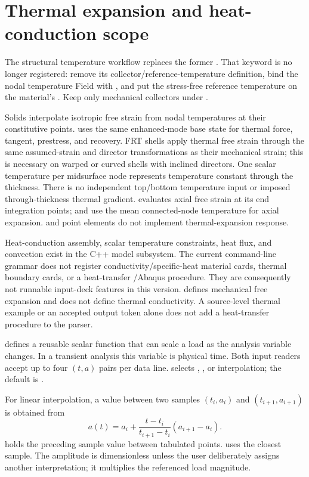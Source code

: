 \section{Thermal expansion and heat-conduction scope}

The structural temperature workflow replaces the former . That keyword is no longer registered: remove its collector/reference-temperature definition, bind the nodal temperature Field with , and put the stress-free reference temperature on the material's . Keep only mechanical collectors under .

Solids interpolate isotropic free strain from nodal temperatures at their constitutive points.  uses the same enhanced-mode base state for thermal force, tangent, prestress, and recovery. FRT shells apply thermal free strain through the same assumed-strain and director transformations as their mechanical strain; this is necessary on warped or curved shells with inclined directors. One scalar temperature per midsurface node represents temperature constant through the thickness. There is no independent top/bottom temperature input or imposed through-thickness thermal gradient.  evaluates axial free strain at its end integration points;  and  use the mean connected-node temperature for axial expansion.  and point elements do not implement thermal-expansion response.

Heat-conduction assembly, scalar temperature constraints, heat flux, and convection exist in the C++ model subsystem. The current command-line grammar does not register conductivity/specific-heat material cards, thermal boundary cards, or a heat-transfer /Abaqus procedure. They are consequently not runnable input-deck features in this version.  defines mechanical free expansion and does not define thermal conductivity. A source-level thermal example or an accepted output token alone does not add a heat-transfer procedure to the parser.


 defines a reusable scalar function that can scale a load as the analysis variable changes. In a transient analysis this variable is physical time. Both input readers accept up to four \((t,a)\) pairs per data line.  selects , , or  interpolation; the default is .

For linear interpolation, a value between two samples \((t_i,a_i)\) and \((t_{i+1},a_{i+1})\) is obtained from
\[
a(t)=a_i+\frac{t-t_i}{t_{i+1}-t_i}\left(a_{i+1}-a_i\right).
\]
 holds the preceding sample value between tabulated points.  uses the closest sample. The amplitude is dimensionless unless the user deliberately assigns another interpretation; it multiplies the referenced load magnitude.

